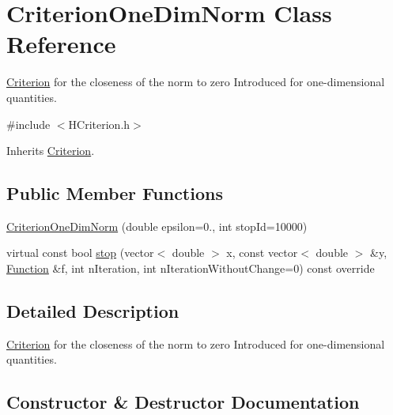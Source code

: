 \hypertarget{class_criterion_one_dim_norm}{}\section{Criterion\+One\+Dim\+Norm Class Reference}
\label{class_criterion_one_dim_norm}


\hyperlink{class_criterion}{Criterion} for the closeness of the norm to zero Introduced for one-\/dimensional quantities.  




{\ttfamily \#include $<$H\+Criterion.\+h$>$}



Inherits \hyperlink{class_criterion}{Criterion}.

\subsection*{Public Member Functions}
\begin{DoxyCompactItemize}
\item 
\hyperlink{class_criterion_one_dim_norm_a6e13ccb705e321e0a6f09618f72c4918}{Criterion\+One\+Dim\+Norm} (double epsilon=0., int stop\+Id=10000)
\item 
virtual const bool \hyperlink{class_criterion_one_dim_norm_a34169be5a51a1146f087858cc9716be7}{stop} (vector$<$ double $>$ x, const vector$<$ double $>$ \&y, \hyperlink{class_function}{Function} \&f, int n\+Iteration, int n\+Iteration\+Without\+Change=0) const override
\end{DoxyCompactItemize}


\subsection{Detailed Description}
\hyperlink{class_criterion}{Criterion} for the closeness of the norm to zero Introduced for one-\/dimensional quantities. 

\subsection{Constructor \& Destructor Documentation}
\mbox{\label{class_criterion_one_dim_norm_a6e13ccb705e321e0a6f09618f72c4918}} 

